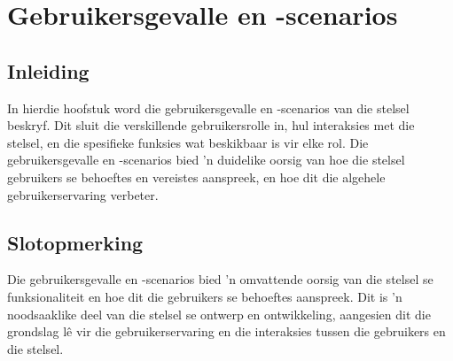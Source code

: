 \chapter{Gebruikersgevalle en -scenarios}

\section{Inleiding}
In hierdie hoofstuk word die gebruikersgevalle en -scenarios van die stelsel
beskryf. Dit sluit die verskillende gebruikersrolle in, hul interaksies met die
stelsel, en die spesifieke funksies wat beskikbaar is vir elke rol. Die
gebruikersgevalle en -scenarios bied 'n duidelike oorsig van hoe die stelsel
gebruikers se behoeftes en vereistes aanspreek, en hoe dit die algehele
gebruikerservaring verbeter.











\section{Slotopmerking}
Die gebruikersgevalle en -scenarios bied 'n omvattende oorsig van die
stelsel se funksionaliteit en hoe dit die gebruikers se behoeftes aanspreek. Dit
is 'n noodsaaklike deel van die stelsel se ontwerp en ontwikkeling, aangesien
dit die grondslag l\^e vir die gebruikerservaring en die interaksies tussen die
gebruikers en die stelsel.